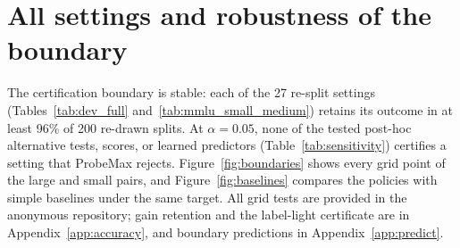 \section{All settings and robustness of the boundary}\label{app:ledger}

The certification boundary is stable: each of the 27 re-split settings (Tables~\ref{tab:dev_full} and~\ref{tab:mmlu_small_medium}) retains its outcome in at least 96\% of 200 re-drawn splits. At $\alpha=0.05$, none of the tested post-hoc alternative tests, scores, or learned predictors (Table~\ref{tab:sensitivity}) certifies a setting that ProbeMax rejects. Figure~\ref{fig:boundaries} shows every grid point of the large and small pairs, and Figure~\ref{fig:baselines} compares the policies with simple baselines under the same target. All grid tests are provided in the anonymous repository; gain retention and the label-light certificate are in Appendix~\ref{app:accuracy}, and boundary predictions in Appendix~\ref{app:predict}.

